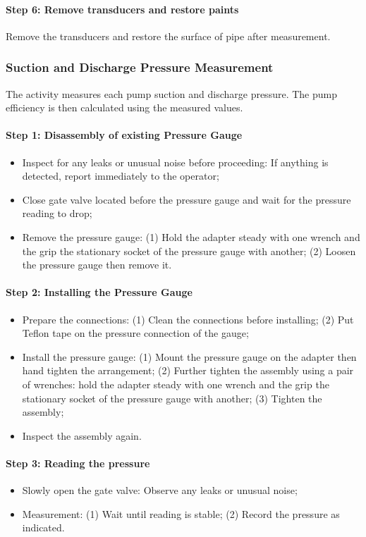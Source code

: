 \paragraph{Step 6: Remove transducers and restore paints}
Remove the transducers and restore the surface of pipe after measurement.

\subsubsection{Suction and Discharge Pressure Measurement}
The activity measures each pump suction and discharge pressure. The pump efficiency is then calculated using the measured values.

\paragraph{Step 1: Disassembly of existing Pressure Gauge}
\begin{itemize}
\item Inspect for any leaks or unusual noise before proceeding: If anything is detected, report immediately to the operator;
\item 	Close gate valve located before the pressure gauge and wait for the pressure reading to drop;
\item 	Remove the pressure gauge: (1) Hold the adapter steady with one wrench and the grip the stationary socket of the pressure gauge with another; (2) Loosen the pressure gauge then remove it.
\end{itemize}

\paragraph{Step 2: Installing the Pressure Gauge}
\begin{itemize}
\item Prepare the connections: (1) Clean the connections before installing; (2) Put Teflon tape on the pressure connection of the gauge;
\item Install the pressure gauge: (1) Mount the pressure gauge on the adapter then hand tighten the arrangement; (2) Further tighten the assembly using a pair of wrenches: hold the adapter steady with one wrench and the grip the stationary socket of the pressure gauge with another; (3) Tighten the assembly;
\item Inspect the assembly again.
\end{itemize}
\paragraph{Step 3: Reading the pressure}
\begin{itemize}
\item Slowly open the gate valve: Observe any leaks or unusual noise;
\item Measurement: (1) Wait until reading is stable; (2) Record the pressure as indicated.
\end{itemize}

